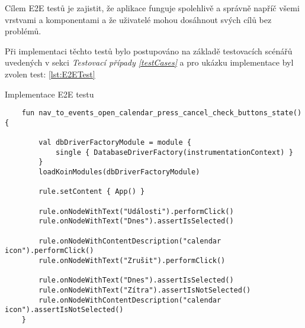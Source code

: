 Cílem E2E testů je zajistit, že aplikace funguje spolehlivě a správně napříč všemi vrstvami a komponentami a že uživatelé mohou dosáhnout 
svých cílů bez problémů.

\bigskip
Při implementaci těchto testů bylo postupováno na základě testovacích scénářů uvedených v sekci \textit{Testovací případy \ref{testCases}} a pro
ukázku implementace byl zvolen test: \ref{lst:E2ETest}

\begin{listing}[H]
  \caption{Implementace E2E testu}\label{lst:E2ETest}
  \begin{verbatim}
    fun nav_to_events_open_calendar_press_cancel_check_buttons_state() {

        val dbDriverFactoryModule = module {
            single { DatabaseDriverFactory(instrumentationContext) }
        }
        loadKoinModules(dbDriverFactoryModule)

        rule.setContent { App() }

        rule.onNodeWithText("Události").performClick()
        rule.onNodeWithText("Dnes").assertIsSelected()

        rule.onNodeWithContentDescription("calendar icon").performClick()
        rule.onNodeWithText("Zrušit").performClick()

        rule.onNodeWithText("Dnes").assertIsSelected()
        rule.onNodeWithText("Zítra").assertIsNotSelected()
        rule.onNodeWithContentDescription("calendar icon").assertIsNotSelected()
    }
\end{verbatim}
\end{listing}


